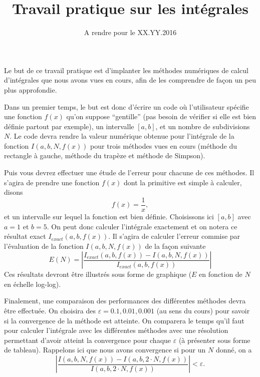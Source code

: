 \documentclass[a4paper,10pt]{article}
\title{Travail pratique sur les intégrales}
\date{A rendre pour le XX.YY.2016}
\begin{document}
\maketitle

Le but de ce travail pratique est d'implanter les méthodes numériques de calcul d'intégrales que nous avons vues en cours,
afin de les comprendre de façon un peu plus approfondie.

Dans un premier temps, le but est donc d'écrire un code où l'utilisateur spécifie une fonction $f(x)$ qu'on 
suppose ``gentille'' (pas besoin de vérifier 
si elle est bien définie partout par exemple), un intervalle $[a,b]$, et 
un nombre de subdivisions $N$. Le code devra rendre la valeur numérique obtenue pour l'intégrale de la fonction $I(a,b,N,f(x))$ 
pour trois méthodes 
vues en cours (méthode du rectangle à gauche, méthode du trapèze et méthode de Simpson).

Puis vous devrez effectuer une étude de l'erreur pour chacune de ces méthodes. Il s'agira de prendre une fonction $f(x)$ 
dont la primitive est simple à calculer, disons
\begin{equation}
f(x)=\frac{1}{x},
\end{equation}
et un intervalle sur lequel la fonction est bien définie. Choisissons ici $[a,b]$ avec $a=1$ et $b=5$. 
On peut donc calculer l'intégrale exactement et on notera ce résultat exact $I_{exact}(a,b,f(x))$.
Il s'agira de calculer l'erreur commise par l'évaluation de la fonction $I(a,b,N,f(x))$ de la façon suivante
\begin{equation}
 E(N)=\left|\frac{I_{exact}(a,b,f(x))-I(a,b,N,f(x))}{I_{exact}(a,b,f(x))}\right|
\end{equation}
Ces résultats devront être illustrés sous forme de graphique ($E$ en fonction de $N$ en échelle log-log).

Finalement, une comparaison des performances des différentes méthodes devra être effectuée.
On choisira des $\varepsilon=0.1,0.01,0.001$ (au sens du cours) pour savoir si la convergence de la méthode est atteinte.
On comparera le temps qu'il faut pour calculer l'intégrale avec les différentes méthodes
avec une résolution permettant d'avoir atteint la convergence pour chaque $\varepsilon$
(à présenter sous forme de tableau). 
Rappelons ici que nous avons convergence si pour un $N$ donné, on a
\begin{equation}
 \left|\frac{I(a,b,N,f(x))-I(a,b,2\cdot N,f(x))}{I(a,b,2\cdot N,f(x))}\right|<\varepsilon.
\end{equation}
\end{document}
